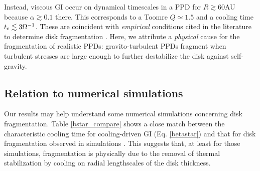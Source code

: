 Instead, viscous GI occur on dynamical timescales in a PPD for
$R\gtrsim 60$AU because $\alpha\gtrsim0.1$ there. 
This corresponds to a Toomre $Q\simeq 1.5$ and 
a cooling time $t_\mathrm{c}\lesssim 3\Omega^{-1}$. These are coincident with 
\emph{empirical} conditions cited in the literature to determine disk
fragmentation 
\citep[e.g.][]{rafikov15}. Here, we attribute a \emph{physical}
cause for the fragmentation of realistic PPDs: gravito-turbulent PPDs
fragment when turbulent stresses are large enough to further
destabilize the disk against self-gravity.    


\subsection{Relation to numerical simulations}\label{prev_works}
Our results may help understand some numerical simulations 
concerning disk fragmentation. Table 
\ref{bstar_compare} shows a close match between the characteristic
cooling time for cooling-driven GI (Eq. \ref{betastar}) 
and that for disk fragmentation observed in simulations 
\citep{gammie01,rice05,rice11}. This suggests that, at least for those
simulations, fragmentation is physically due to the removal of
thermal stabilization by cooling on radial lengthscales of the disk 
thickness.   



